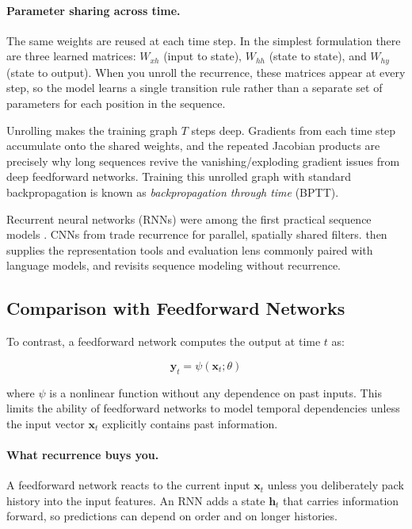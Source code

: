 \paragraph{Parameter sharing across time.} The same weights are reused at each time step. In the simplest formulation there are three learned matrices: \(W_{xh}\) (input to state), \(W_{hh}\) (state to state), and \(W_{hy}\) (state to output). When you unroll the recurrence, these matrices appear at every step, so the model learns a single transition rule rather than a separate set of parameters for each position in the sequence.

Unrolling makes the training graph \(T\) steps deep. Gradients from each time step accumulate onto the shared weights, and the repeated Jacobian products are precisely why long sequences revive the vanishing/exploding gradient issues from deep feedforward networks.
Training this unrolled graph with standard backpropagation is known as \emph{backpropagation through time} (BPTT).

Recurrent neural networks (RNNs) were among the first practical sequence models \citep{Elman1990,Bengio1994}. CNNs from  trade recurrence for parallel, spatially shared filters.  then supplies the representation tools and evaluation lens commonly paired with language models, and  revisits sequence modeling without recurrence.

\subsection{Comparison with Feedforward Networks}
\label{sec:rnn_comparison_with_feedforward_networks}

To contrast, a feedforward network computes the output at time $t$ as:

\begin{equation}
    \mathbf{y}_t = \psi(\mathbf{x}_t; \theta)
    \label{eq:ffn_output}
\end{equation}

where $\psi$ is a nonlinear function without any dependence on past inputs. This limits the ability of feedforward networks to model temporal dependencies unless the input vector $\mathbf{x}_t$ explicitly contains past information.

\paragraph{What recurrence buys you.}
A feedforward network reacts to the current input \(\mathbf{x}_t\) unless you deliberately pack history into the input features. An RNN adds a state \(\mathbf{h}_t\) that carries information forward, so predictions can depend on order and on longer histories.

